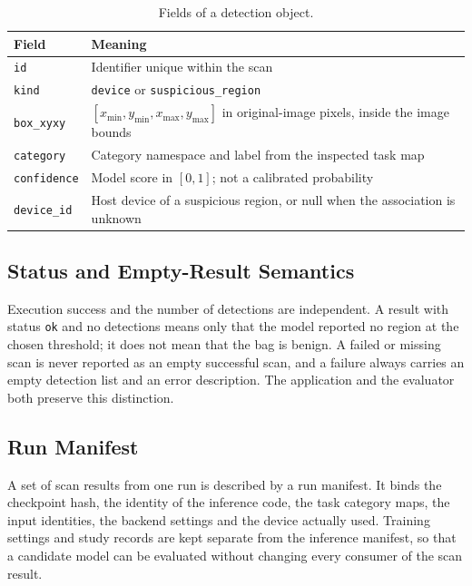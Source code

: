 \begin{table}[htbp]
\centering\tablesetup
\caption{Fields of a detection object.}
\label{tab:detection}
\begin{tabularx}{\textwidth}{@{}L{0.2\textwidth}Y@{}}
\toprule
Field & Meaning\\
\midrule
\texttt{id} & Identifier unique within the scan\\
\texttt{kind} & \texttt{device} or \texttt{suspicious\_region}\\
\texttt{box\_xyxy} & $[x_{\min}, y_{\min}, x_{\max}, y_{\max}]$ in original-image
pixels, inside the image bounds\\
\texttt{category} & Category namespace and label from the inspected task map\\
\texttt{confidence} & Model score in $[0,1]$; not a calibrated probability\\
\texttt{device\_id} & Host device of a suspicious region, or null when the
association is unknown\\
\bottomrule
\end{tabularx}
\end{table}

\subsection{Status and Empty-Result Semantics}
Execution success and the number of detections are independent. A result with
status \texttt{ok} and no detections means only that the model reported no region
at the chosen threshold; it does not mean that the bag is benign. A failed or
missing scan is never reported as an empty successful scan, and a failure always
carries an empty detection list and an error description. The application and
the evaluator both preserve this distinction.

\subsection{Run Manifest}
A set of scan results from one run is described by a run manifest. It binds the
checkpoint hash, the identity of the inference code, the task category maps, the
input identities, the backend settings and the device actually used. Training
settings and study records are kept separate from the inference manifest, so that
a candidate model can be evaluated without changing every consumer of the scan
result.

